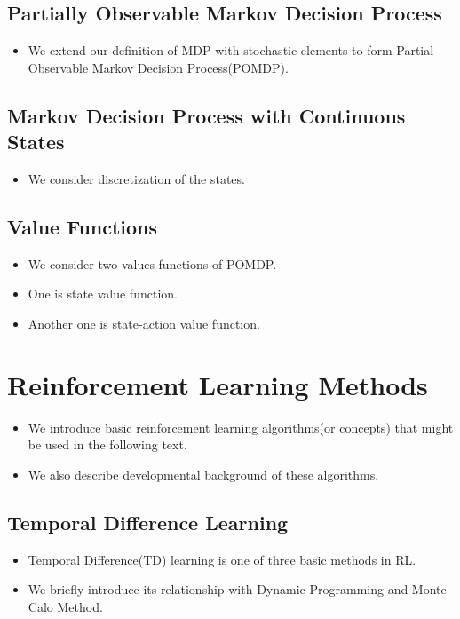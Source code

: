 \documentclass[officiallayout]{tktla}
\begin{document}
\subsection{Partially Observable Markov Decision Process}
\begin{itemize}
\item We extend our definition of MDP with stochastic elements to form Partial Observable Markov Decision Process(POMDP).
\end{itemize}

\subsection{Markov Decision Process with Continuous States}

\begin{itemize}
\item We consider discretization of the states. 
\end{itemize}

\subsection{Value Functions}
\begin{itemize}
\item We consider two values functions of POMDP.
\item One is state value function.
\item Another one is state-action value function.
\end{itemize}

\section{Reinforcement Learning Methods}
\begin{itemize}
\item We introduce basic reinforcement learning algorithms(or concepts) that might be used in the following text.
\item We also describe developmental background of these algorithms.
\end{itemize}

\subsection{Temporal Difference Learning}

\begin{itemize}
\item Temporal Difference(TD) learning is one of three basic methods in RL.
\item We briefly introduce its relationship with Dynamic Programming and Monte Calo Method.
\end{itemize}
\end{document}
